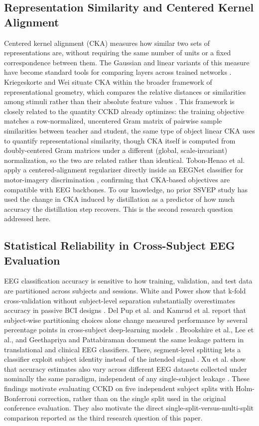 \documentclass[11pt,a4paper,twoside,asymmetric]{article}
\begin{document}
\subsection{Representation Similarity and Centered Kernel Alignment}
Centered kernel alignment (CKA) measures how similar two sets of representations are, without requiring the same number of units or a fixed correspondence between them. The Gaussian and linear variants of this measure have become standard tools for comparing layers across trained networks \cite{R73,R74,R71}. Kriegeskorte and Wei situate CKA within the broader framework of representational geometry, which compares the relative distances or similarities among stimuli rather than their absolute feature values \cite{R72}. This framework is closely related to the quantity CCKD already optimizes: the training objective matches a row-normalized, uncentered Gram matrix of pairwise sample similarities between teacher and student, the same type of object linear CKA uses to quantify representational similarity, though CKA itself is computed from doubly-centered Gram matrices under a different (global, scale-invariant) normalization, so the two are related rather than identical. Tobon-Henao et al. apply a centered-alignment regularizer directly inside an EEGNet classifier for motor-imagery discrimination \cite{R70}, confirming that CKA-based objectives are compatible with EEG backbones. To our knowledge, no prior SSVEP study has used the change in CKA induced by distillation as a predictor of how much accuracy the distillation step recovers. This is the second research question addressed here.

\subsection{Statistical Reliability in Cross-Subject EEG Evaluation}
EEG classification accuracy is sensitive to how training, validation, and test data are partitioned across subjects and sessions. White and Power show that k-fold cross-validation without subject-level separation substantially overestimates accuracy in passive BCI designs \cite{R75}. Del Pup et al. and Kamrud et al. report that subject-wise partitioning choices alone change measured performance by several percentage points in cross-subject deep-learning models \cite{R76,R79}. Brookshire et al., Lee et al., and Geethapriya and Pattabiraman document the same leakage pattern in translational and clinical EEG classifiers. There, segment-level splitting lets a classifier exploit subject identity instead of the intended signal \cite{R77,R78,R81}. Xu et al. show that accuracy estimates also vary across different EEG datasets collected under nominally the same paradigm, independent of any single-subject leakage \cite{R80}. These findings motivate evaluating CCKD on five independent subject splits with Holm-Bonferroni correction, rather than on the single split used in the original conference evaluation. They also motivate the direct single-split-versus-multi-split comparison reported as the third research question of this paper.
\end{document}
